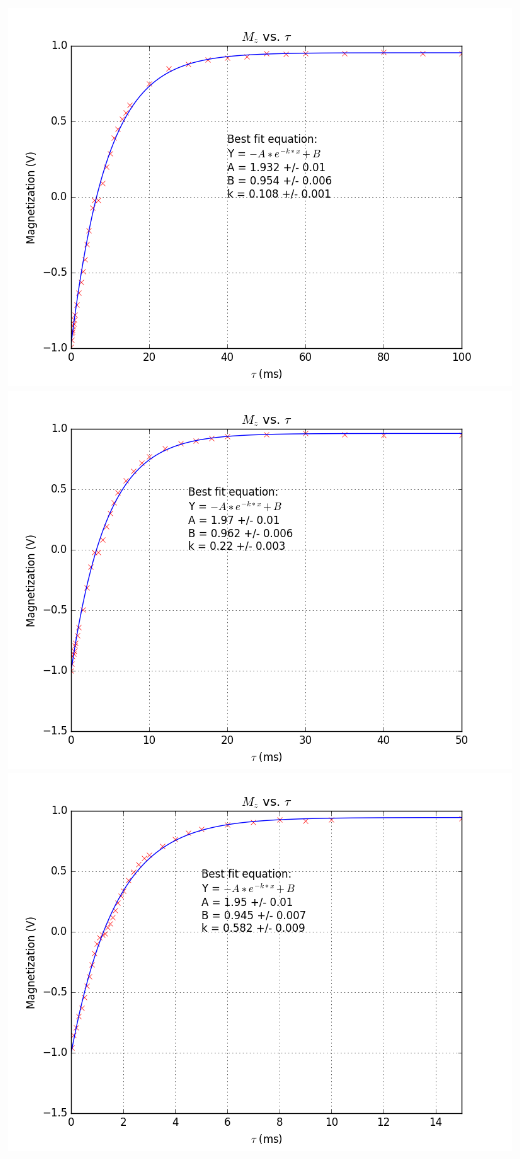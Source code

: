 \documentclass{article}
\begin{document}
{\begin{multicols}{2}
\label{fig:22}
\includegraphics[width=\linewidth]{pic-for-report/0.100M-CuSO4-T1-inset.png}
\label{fig:23}
\includegraphics[width=\linewidth]{pic-for-report/0.200M-CuSO4-T1-inset.png}
\label{fig:24}
\includegraphics[width=\linewidth]{pic-for-report/0.500M-CuSO4-T1-inset.png}

\end{multicols}}
\end{document}
